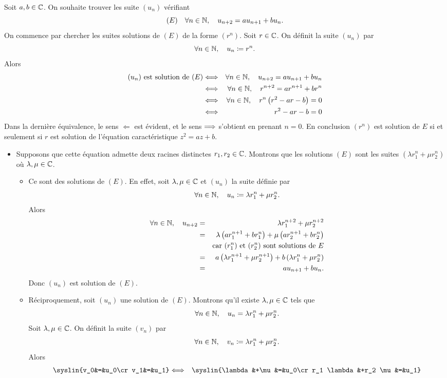 \documentclass{magnoliaold}
\begin{document}
\begin{preuve}
Soit $a,b\in\mathbb{C}$. On souhaite trouver les suite $(u_n)$ vérifiant
\[(E)\quad\forall n\in\mathbb{N} ,\quad u_{n+2}=au_{n+1}+b u_n.\]
On commence par chercher les suites solutions de $(E)$ de la forme $(r^n)$. Soit $r\in\mathbb{C}$. On définit la suite $(u_n)$ par
\[\forall n\in\mathbb{N},\quad u_n\coloneqq r^n.\]
Alors
\begin{eqnarray*}
\text{$(u_n)$ est solution de $(E)$}
&\Longleftrightarrow& \forall n\in\mathbb{N},\quad u_{n+2}=au_{n+1}+b u_n\\
&\Longleftrightarrow& \forall n\in\mathbb{N},\quad r^{n+2}=a r^{n+1}+b r^n\\
&\Longleftrightarrow& \forall n\in\mathbb{N},\quad r^n\left(r^2-ar-b\right)=0\\
&\Longleftrightarrow& r^2-ar-b=0
\end{eqnarray*}
Dans la dernière équivalence, le sens $\Longleftarrow$ est évident, et le sens $\Longrightarrow$ s'obtient en prenant $n=0$. En conclusion $(r^n)$ est solution de $E$ si et seulement si $r$ est solution de l'équation caractéristique $z^2=az+b$.
\begin{itemize}
\item Supposons que cette équation admette deux racines distinctes $r_1, r_2\in\mathbb{C}$. Montrons que les solutions $(E)$ sont les suites $(\lambda r_1^n+\mu r_2^n)$ où $\lambda,\mu\in\mathbb{C}$.
\begin{itemize}
\item Ce sont des solutions de $(E)$. En effet, soit $\lambda,\mu\in\mathbb{C}$ et $(u_n)$ la suite définie par
\[\forall n\in\mathbb{N},\quad u_n\coloneqq\lambda r_1^n+\mu r_2^n.\]
Alors
\begin{eqnarray*}
\forall n\in\mathbb{N},\quad u_{n+2}
&=& \lambda r_1^{n+2} + \mu r_2^{n+2}\\
&=& \lambda \left(a r_1^{n+1}+b r_1^n\right) + \mu \left(a r_2^{n+1}+b r_2^n\right)\\
& & \text{car $(r_1^n)$ et $(r_2^n)$ sont solutions de $E$}\\
&=& a\left(\lambda r_1^{n+1}+\mu r_2^{n+1}\right) + b\left(\lambda r_1^n + \mu r_2^n\right)\\
&=& a u_{n+1}+b u_n.
\end{eqnarray*}
Donc $(u_n)$ est solution de $(E)$.
\item Réciproquement, soit $(u_n)$ une solution de $(E)$. Montrons qu'il existe $\lambda,\mu\in\mathbb{C}$ tels que
\[\forall n\in\mathbb{N},\quad u_n=\lambda r_1^n+\mu r_2^n.\]
Soit $\lambda,\mu\in\mathbb{C}$. On définit la suite $(v_n)$ par
\[\forall n\in\mathbb{N},\quad v_n\coloneqq\lambda r_1^n+\mu r_2^n.\]
Alors
\begin{eqnarray*}
\syslin{v_0&=&u_0\cr v_1&=&u_1}
&\ssi& \syslin{\lambda &+\mu&=&u_0\cr r_1 \lambda&+r_2 \mu&=&u_1}\\

\end{eqnarray*}
\end{itemize}
\end{itemize}
\end{preuve}
\end{document}
